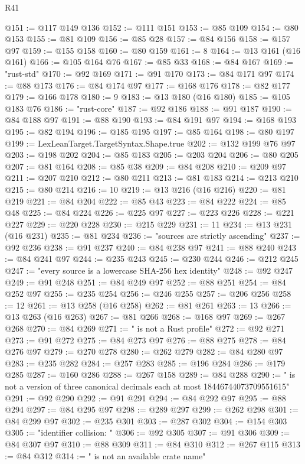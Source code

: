 \begin{lexlean}{R41}
\begin{coremodule}
{{{{{{{{{{{{{{{{{{{{{{{{{{{{{{{{{{{{{{{{{{{{{{{{{{{{{{{{{{{{{{{{{{{{{{{{{{{{{{{{{{{{{{{@151 := @117 @149 @136
@152 := @111 @151
@153 := @85 @109
@154 := @80 @153
@155 := @81 @109
@156 := @85 @28
@157 := @84 @156
@158 := @157 @97
@159 := @155 @158
@160 := @80 @159
@161 := 8
@164 := @13 @161 (@16 @161)
@166 := @105 @164 @76
@167 := @85 @33
@168 := @84 @167
@169 := "rust-std"
@170 := @92 @169
@171 := @91 @170
@173 := @84 @171 @97
@174 := @88 @173
@176 := @84 @174 @97
@177 := @168 @176
@178 := @82 @177
@179 := @166 @178
@180 := 9
@183 := @13 @180 (@16 @180)
@185 := @105 @183 @76
@186 := "rust-core"
@187 := @92 @186
@188 := @91 @187
@190 := @84 @188 @97
@191 := @88 @190
@193 := @84 @191 @97
@194 := @168 @193
@195 := @82 @194
@196 := @185 @195
@197 := @85 @164
@198 := @80 @197
@199 := LexLeanTarget.TargetSyntax.Shape.true
@202 := @132 @199 @76 @97
@203 := @198 @202
@204 := @85 @183
@205 := @203 @204
@206 := @80 @205
@207 := @81 @164
@208 := @85 @38
@209 := @84 @208
@210 := @209 @97
@211 := @207 @210
@212 := @80 @211
@213 := @81 @183
@214 := @213 @210
@215 := @80 @214
@216 := 10
@219 := @13 @216 (@16 @216)
@220 := @81 @219
@221 := @84 @204
@222 := @85 @43
@223 := @84 @222
@224 := @85 @48
@225 := @84 @224
@226 := @225 @97
@227 := @223 @226
@228 := @221 @227
@229 := @220 @228
@230 := @215 @229
@231 := 11
@234 := @13 @231 (@16 @231)
@235 := @81 @234
@236 := "sources are strictly ascending"
@237 := @92 @236
@238 := @91 @237
@240 := @84 @238 @97
@241 := @88 @240
@243 := @84 @241 @97
@244 := @235 @243
@245 := @230 @244
@246 := @212 @245
@247 := "every source is a lowercase SHA-256 hex identity"
@248 := @92 @247
@249 := @91 @248
@251 := @84 @249 @97
@252 := @88 @251
@254 := @84 @252 @97
@255 := @235 @254
@256 := @246 @255
@257 := @206 @256
@258 := 12
@261 := @13 @258 (@16 @258)
@262 := @81 @261
@263 := 13
@266 := @13 @263 (@16 @263)
@267 := @81 @266
@268 := @168 @97
@269 := @267 @268
@270 := @84 @269
@271 := " is not a Rust profile"
@272 := @92 @271
@273 := @91 @272
@275 := @84 @273 @97
@276 := @88 @275
@278 := @84 @276 @97
@279 := @270 @278
@280 := @262 @279
@282 := @84 @280 @97
@283 := @235 @282
@284 := @257 @283
@285 := @196 @284
@286 := @179 @285
@287 := @160 @286
@288 := @267 @158
@289 := @84 @288
@290 := " is not a version of three canonical decimals each at most 18446744073709551615"
@291 := @92 @290
@292 := @91 @291
@294 := @84 @292 @97
@295 := @88 @294
@297 := @84 @295 @97
@298 := @289 @297
@299 := @262 @298
@301 := @84 @299 @97
@302 := @235 @301
@303 := @287 @302
@304 := @154 @303
@305 := "identifier collision: "
@306 := @92 @305
@307 := @91 @306
@309 := @84 @307 @97
@310 := @88 @309
@311 := @84 @310
@312 := @267 @115
@313 := @84 @312
@314 := " is not an available crate name"
}}}}}}}}}}}}}}}}}}}}}}}}}}}}}}}}}}}}}}}}}}}}}}}}}}}}}}}}}}}}}}}}}}}}}}}}}}}}}}}}}}}}}}}
\end{coremodule}
\end{lexlean}
